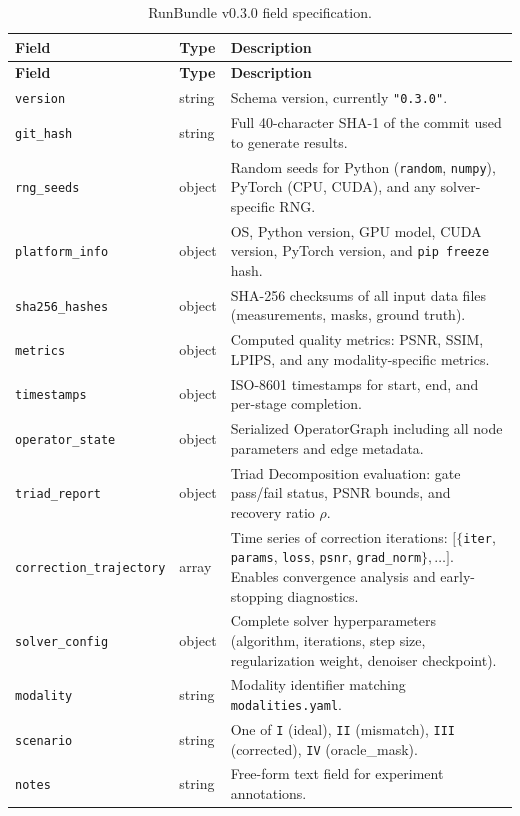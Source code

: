 \documentclass[11pt]{article}
\begin{document}
\begin{longtable}{l l p{7cm}}
\caption{RunBundle v0.3.0 field specification.}
\label{tab:runbundle} \\
\toprule
\textbf{Field} & \textbf{Type} & \textbf{Description} \\
\midrule
\endfirsthead
\toprule
\textbf{Field} & \textbf{Type} & \textbf{Description} \\
\midrule
\endhead
\bottomrule
\endlastfoot
\texttt{version}        & string   & Schema version, currently \texttt{"0.3.0"}. \\
\texttt{git\_hash}      & string   & Full 40-character SHA-1 of the commit used to generate results. \\
\texttt{rng\_seeds}     & object   & Random seeds for Python (\texttt{random}, \texttt{numpy}), PyTorch (CPU, CUDA), and any solver-specific RNG. \\
\texttt{platform\_info} & object   & OS, Python version, GPU model, CUDA version, PyTorch version, and \texttt{pip freeze} hash. \\
\texttt{sha256\_hashes} & object   & SHA-256 checksums of all input data files (measurements, masks, ground truth). \\
\texttt{metrics}        & object   & Computed quality metrics: PSNR, SSIM, LPIPS, and any modality-specific metrics. \\
\texttt{timestamps}     & object   & ISO-8601 timestamps for start, end, and per-stage completion. \\
\texttt{operator\_state}& object   & Serialized OperatorGraph including all node parameters and edge metadata. \\
\texttt{triad\_report}  & object   & Triad Decomposition evaluation: gate pass/fail status, PSNR bounds, and recovery ratio $\rho$. \\
\texttt{correction\_trajectory} & array &
  Time series of correction iterations: $[\{$\texttt{iter}, \texttt{params},
  \texttt{loss}, \texttt{psnr}, \texttt{grad\_norm}$\}, \ldots]$.
  Enables convergence analysis and early-stopping diagnostics. \\
\texttt{solver\_config} & object   & Complete solver hyperparameters (algorithm, iterations, step size, regularization weight, denoiser checkpoint). \\
\texttt{modality}       & string   & Modality identifier matching \texttt{modalities.yaml}. \\
\texttt{scenario}       & string   & One of \texttt{I} (ideal), \texttt{II} (mismatch), \texttt{III} (corrected), \texttt{IV} (oracle\_mask). \\
\texttt{notes}          & string   & Free-form text field for experiment annotations. \\
\end{longtable}
\end{document}
